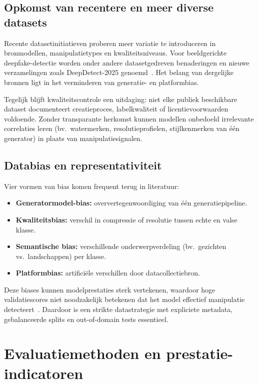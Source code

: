 \subsection{Opkomst van recentere en meer diverse datasets}
Recente datasetinitiatieven proberen meer variatie te introduceren in bronmodellen, manipulatietypes en kwaliteitsniveaus. Voor beeldgerichte deepfake-detectie worden onder andere datasetgedreven benaderingen en nieuwe verzamelingen zoals DeepDetect-2025 genoemd~\autocite{HybridDataset2025,DeepDetectDataset2025}. Het belang van dergelijke bronnen ligt in het verminderen van generatie- en platformbias.

Tegelijk blijft kwaliteitscontrole een uitdaging: niet elke publiek beschikbare dataset documenteert creatieproces, labelkwaliteit of licentievoorwaarden voldoende. Zonder transparante herkomst kunnen modellen onbedoeld irrelevante correlaties leren (bv.~watermerken, resolutieprofielen, stijlkenmerken van één generator) in plaats van manipulatiesignalen.

\subsection{Databias en representativiteit}
Vier vormen van bias komen frequent terug in literatuur:
\begin{itemize}
  \item \textbf{Generatormodel-bias:} oververtegenwoordiging van één generatiepipeline.
  \item \textbf{Kwaliteitsbias:} verschil in compressie of resolutie tussen echte en valse klasse.
  \item \textbf{Semantische bias:} verschillende onderwerpverdeling (bv.~gezichten vs.~landschappen) per klasse.
  \item \textbf{Platformbias:} artificiële verschillen door datacollectiebron.
\end{itemize}

Deze biases kunnen modelprestaties sterk vertekenen, waardoor hoge validatiescores niet noodzakelijk betekenen dat het model effectief manipulatie detecteert~\autocite{EvaluationModels2025}. Daardoor is een strikte datastrategie met expliciete metadata, gebalanceerde splits en out-of-domain tests essentieel.

\section{Evaluatiemethoden en prestatie-indicatoren}

